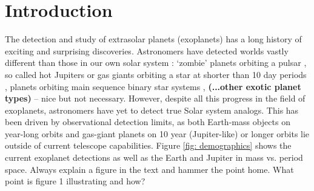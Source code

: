 \documentclass[twocolumn]{aastex631}
\newcommand{\racomment}[1]{{\color{blue}#1}}
\begin{document}

\section{Introduction} \label{sec:intro}


The detection and study of extrasolar planets (exoplanets) has a long history of exciting and surprising discoveries. Astronomers have detected worlds vastly different than those in our own solar system \racomment{: `zombie' planets orbiting a pulsar \citep{Wolszczan1992}, so called hot Jupiters or gas giants orbiting a star at shorter than 10 day periods \citep{Latham1989, Mayor1995}, planets orbiting main sequence binary star systems \citep{Correia2005}, \textbf{(...other exotic planet types)} -- nice but not necessary}. However, despite all this progress in the field of exoplanets, astronomers have yet to detect true Solar system analogs. This has been driven by observational detection limits, as both Earth-mass objects on year-long orbits and gas-giant planets on 10 year (Jupiter-like) or longer orbits lie outside of current telescope capabilities. Figure \ref{fig: demographics} shows the current exoplanet detections as well as the Earth and Jupiter in mass vs. period space.
\racomment{Always explain a figure in the text and hammer the point home. What point is figure 1 illustrating and how?}
\end{document}
